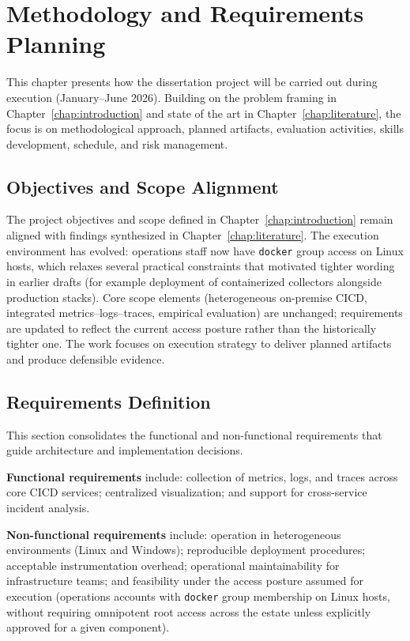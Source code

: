 \chapter{Methodology and Requirements Planning}
\label{chap:planning}

This chapter presents how the dissertation project will be carried out during execution (January--June 2026). Building on the problem framing in Chapter~\ref{chap:introduction} and state of the art in Chapter~\ref{chap:literature}, the focus is on methodological approach, planned artifacts, evaluation activities, skills development, schedule, and risk management.

\section{Objectives and Scope Alignment}

The project objectives and scope defined in Chapter~\ref{chap:introduction} remain aligned with findings synthesized in Chapter~\ref{chap:literature}. The execution environment has evolved: operations staff now have \texttt{docker} group access on Linux hosts, which relaxes several practical constraints that motivated tighter wording in earlier drafts (for example deployment of containerized collectors alongside production stacks). Core scope elements (heterogeneous on-premise \ac{CICD}, integrated metrics--logs--traces, empirical evaluation) are unchanged; requirements are updated to reflect the current access posture rather than the historically tighter one. The work focuses on execution strategy to deliver planned artifacts and produce defensible evidence.

\section{Requirements Definition}
\label{sec:ch3_requirements}

This section consolidates the functional and non-functional requirements that guide architecture and implementation decisions.

\textbf{Functional requirements} include: collection of metrics, logs, and traces across core \ac{CICD} services; centralized visualization; and support for cross-service incident analysis.

\textbf{Non-functional requirements} include: operation in heterogeneous environments (Linux and Windows); reproducible deployment procedures; acceptable instrumentation overhead; operational maintainability for infrastructure teams; and feasibility under the access posture assumed for execution (operations accounts with \texttt{docker} group membership on Linux hosts, without requiring omnipotent root access across the estate unless explicitly approved for a given component).

